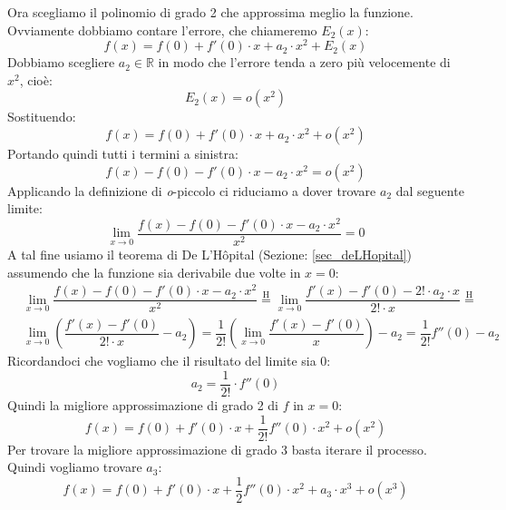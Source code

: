 Ora scegliamo il polinomio di grado 2 che approssima meglio la funzione. Ovviamente dobbiamo contare l'errore, che chiameremo $E_2(x)$:
\begin{equation*}
	f(x) = f(0) + f'(0) \cdot x + a_2 \cdot x^2 + E_2(x)
\end{equation*}
Dobbiamo scegliere $a_2 \in \mathbb{R}$ in modo che l'errore tenda a zero più velocemente di $x^2$, cioè:
\begin{equation*}
	E_2(x) = o(x^2)
\end{equation*}
Sostituendo:
\begin{equation*}
	f(x) = f(0) + f'(0) \cdot x + a_2 \cdot x^2 + o(x^2)
\end{equation*}
Portando quindi tutti i termini a sinistra:
\begin{equation*}
	f(x) - f(0) - f'(0) \cdot x - a_2 \cdot x^2 = o(x^2)
\end{equation*}
Applicando la definizione di \textit{o}-piccolo ci riduciamo a dover trovare $a_2$ dal seguente limite:
\begin{equation*}
	\lim_{x \to 0} \dfrac{f(x) - f(0) - f'(0) \cdot x - a_2 \cdot x^2}{x^2} = 0
\end{equation*}
A tal fine usiamo il teorema di De L'Hôpital (Sezione: \ref{sec_deLHopital}) assumendo che la funzione sia derivabile due volte in $x = 0$:
\begin{align*}
	&\lim_{x \to 0} \dfrac{f(x) - f(0) - f'(0) \cdot x - a_2 \cdot x^2}{x^2} \stackrel{\text{H}}{=} \lim_{x \to 0} \dfrac{f'(x) - f'(0) - 2! \cdot a_2 \cdot x}{2! \cdot x} \stackrel{\text{H}}{=}\\[10pt]
	&\lim_{x \to 0} \left(\dfrac{f'(x) - f'(0)}{2! \cdot x} - a_2\right) = \dfrac{1}{2!} \left(\lim_{x \to 0} \dfrac{f'(x) - f'(0)}{x} \right) - a_2 =  \dfrac{1}{2!} f''(0) - a_2
\end{align*}
Ricordandoci che vogliamo che il risultato del limite sia 0:
\begin{equation*}
	a_2 = \dfrac{1}{2!} \cdot f''(0)
\end{equation*}
Quindi la migliore approssimazione di grado 2 di $f$ in $x = 0$:
\begin{equation*}
	f(x) = f(0) + f'(0) \cdot x + \dfrac{1}{2!} f''(0) \cdot x^2 + o(x^2)
\end{equation*}
Per trovare la migliore approssimazione di grado 3 basta iterare il processo. Quindi vogliamo trovare $a_3$:
\begin{equation*}
	f(x) = f(0) + f'(0) \cdot x + \dfrac{1}{2} f''(0) \cdot x^2 + a_3 \cdot x^3 + o(x^3)
\end{equation*}
